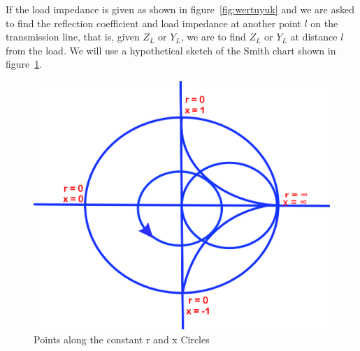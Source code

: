 If the load impedance is given as shown in figure~\ref{fig:wertuyuk} and we are asked to find the reflection coefficient and load impedance at another point $l$ on the transmission line, that is, given $Z_L$ or $Y_L$, we are to find $Z_L$ or $Y_L$ at distance $l$ from the load. We will use a hypothetical sketch of the Smith chart shown in figure~\ref{fig:uytrewsxcvbj}.
\begin{figure}[h]
\centering
\includegraphics[width=0.9\linewidth]{./graphics/uytrewsxcvbj}
\caption{Points along the constant r and x Circles}
\label{fig:uytrewsxcvbj}
\end{figure}

